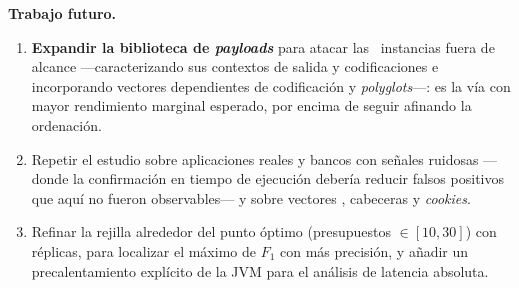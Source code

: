 \noindent\textbf{Trabajo futuro.}
\begin{enumerate}
  \item \textbf{Expandir la biblioteca de \emph{payloads}} para atacar las
  \ValorFNtecho{}~instancias fuera de alcance —caracterizando sus contextos de
  salida y codificaciones e incorporando vectores dependientes de codificación
  y \emph{polyglots}—: es la vía con mayor rendimiento marginal esperado, por
  encima de seguir afinando la ordenación.
  \item Repetir el estudio sobre aplicaciones reales y bancos con señales
  ruidosas —donde la confirmación en tiempo de ejecución debería reducir
  falsos positivos que aquí no fueron observables— y sobre vectores
  , cabeceras y \emph{cookies}.
  \item Refinar la rejilla alrededor del punto óptimo (presupuestos
  $\in [\num{10}, \num{30}]$) con réplicas, para localizar el máximo de $F_1$
  con más precisión, y añadir un precalentamiento explícito de la JVM para el
  análisis de latencia absoluta.
\end{enumerate}

